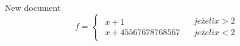 \documentclass{article}
\begin{document}
New document
\begin{equation} f=\left\{\left.\begin{array}{ll}\left.\begin{array}{ll}x+1\\x+45567678768567\end{array}\right.&\left.\begin{array}{ll}jeżeli x \gt 2\\jeżeli x \lt 2\end{array}\right.\end{array}\right. \right. \end{equation}
\end{document}
